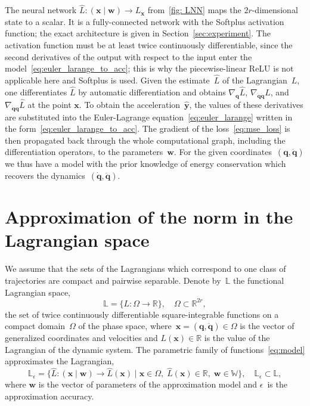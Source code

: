 \documentclass[sn-mathphys-num]{sn-jnl}
\theoremstyle{thmstylethree}
\theoremstyle{thmstyletwo}
\theoremstyle{thmstyleone}
\begin{document}
The neural network $\hat{L} \colon (\mathbf{x} \mid \mathbf{w}) \to L_\mathbf{x}$ from~\eqref{fig: LNN} maps the $2r$-dimensional state to a scalar. It is a fully-connected network with the Softplus activation function; the exact architecture is given in Section~\ref{sec:experiment}. The activation function must be at least twice continuously differentiable, since the second derivatives of the output with respect to the input enter the model~\eqref{eq:euler_larange_to_acc}; this is why the piecewise-linear ReLU is not applicable here and Softplus is used. Given the estimate~$\hat{L}$ of the Lagrangian~$L$, one differentiates $\hat{L}$ by automatic differentiation and obtains $\nabla_{\mathbf{q}}\hat{L}$, $\nabla_{\dot{\mathbf{q}}\dot{\mathbf{q}}}\hat{L}$, and~$\nabla_{\dot{\mathbf{q}}\mathbf{q}} \hat{L}$ at the point $\mathbf{x}$. To obtain the acceleration~$\hat{\mathbf{y}}$, the values of these derivatives are substituted into the Euler-Lagrange equation~\eqref{eq:euler_larange} written in the form~\eqref{eq:euler_larange_to_acc}. The gradient of the loss~\eqref{eq:mse_loss} is then propagated back through the whole computational graph, including the differentiation operators, to the parameters~$\mathbf{w}$. For the given coordinates~$(\mathbf{q}, \dot{\mathbf{q}})$ we thus have a model with the prior knowledge of energy conservation which recovers the dynamics~$(\dot{\mathbf{q}}, \ddot{\mathbf{q}})$.

\section{Approximation of the norm in the Lagrangian space}
We assume that the sets of the Lagrangians which correspond to one class of trajectories are compact and pairwise separable.
Denote by~$\mathbb{L}$ the functional Lagrangian space,
\[
\mathbb{L} = \{ L \colon \Omega \to \mathbb{R} \},
\quad
\Omega \subset \mathbb{R}^{2r},
\]
the set of twice continuously differentiable square-integrable functions on a compact domain~$\Omega$ of the phase space, where~$\mathbf{x} = (\mathbf{q}, \dot{\mathbf{q}}) \in \Omega$ is the vector of generalized coordinates and velocities and $L(\mathbf{x}) \in \mathbb{R}$ is the value of the Lagrangian of the dynamic system. The parametric family of functions~\eqref{eq:model} approximates the Lagrangian,
\[
 \mathbb{L}_{\epsilon} = \{ \hat{L} \colon (\mathbf{x} \mid \mathbf{w}) \to \hat{L}(\mathbf{x}) \mid \mathbf{x} \in \Omega, \; \hat{L}(\mathbf{x})  \in \mathbb{R},\; \mathbf{w} \in \mathbb{W}\}, \quad \mathbb{L}_{\epsilon} \subset \mathbb{L},
\]
where $\mathbf{w}$ is the vector of parameters of the approximation model and $\epsilon$~is the approximation accuracy.
\end{document}
